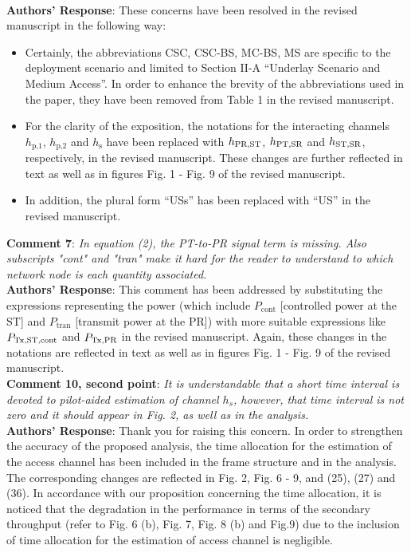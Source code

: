 \documentclass[12pt,a4wide,peerreview]{IEEEtran}
\begin{document}
\\
\textbf{Authors' Response}:
These concerns have been resolved in the revised manuscript in the following way: 
\begin{itemize}
\item Certainly, the abbreviations CSC, CSC-BS, MC-BS, MS are specific to the deployment scenario and limited to Section II-A ``Underlay Scenario and Medium Access''. In order to enhance the brevity of the abbreviations used in the paper, they have been removed from Table 1 in the revised manuscript.
\item For the clarity of the exposition, the notations for the interacting channels $h_{\text{p,1}}$, $h_{\text{p,2}}$ and $h_{\text{s}}$ have been replaced with $h_{\text{PR,ST}}$, $h_{\text{PT,SR}}$ and $h_{\text{ST,SR}}$, respectively, in the revised manuscript. These changes are further reflected in text as well as in figures Fig. 1 - Fig. 9 of the revised manuscript.  
\item In addition, the plural form ``USs'' has been replaced with ``US'' in the revised manuscript. 
\end{itemize}
\textbf{Comment 7}: 
\textit{In equation (2), the PT-to-PR signal term is missing. Also subscripts "cont" and "tran" make it hard for the reader to understand to which network node is each quantity associated.
}
\\
\textbf{Authors' Response}: 
This comment has been addressed by substituting the expressions representing the power (which include $P_{\text{cont}}$ [controlled power at the ST] and $P_{\text{tran}}$ [transmit power at the PR]) with more suitable expressions like $P_{\text{Tx,ST,cont}}$ and $P_{\text{Tx,PR}}$ in the revised manuscript. Again, these changes in the notations are reflected in text as well as in figures Fig. 1 - Fig. 9 of the revised manuscript.
\\
\textbf{Comment 10, second point}:
\textit{
It is understandable that a short time interval is devoted to pilot-aided estimation of channel $h_s$, however, that time interval is not zero and it should appear in Fig. 2, as well as in the analysis.
}
\\
\textbf{Authors' Response}: 
Thank you for raising this concern. In order to strengthen the accuracy of the proposed analysis, the time allocation for the estimation of the access channel has been included in the frame structure and in the analysis. The corresponding changes are reflected in Fig. 2, Fig. 6 - 9, and (25), (27) and (36). In accordance with our proposition concerning the time allocation, it is noticed that the degradation in the performance in terms of the secondary throughput (refer to Fig. 6 (b), Fig. 7, Fig. 8 (b) and Fig.9) due to the inclusion of time allocation for the estimation of access channel is negligible.   
\end{document}
